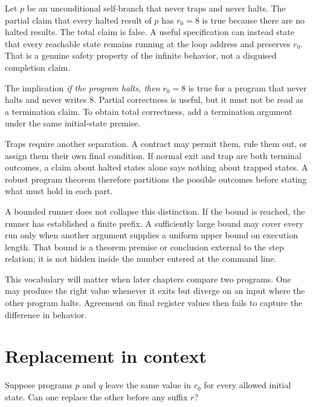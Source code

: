 \begin{example}[title={A vacuous final condition and its repair}]
Let \(p\) be an unconditional self-branch that never traps and never halts.
The partial claim that every halted result of \(p\) has \(r_0=8\) is true
because there are no halted results. The total claim is false. A useful
specification can instead state that every reachable state remains running at
the loop address and preserves \(r_0\). That is a genuine safety property of
the infinite behavior, not a disguised completion claim.
\end{example}

\begin{warning}[title={A true implication may say nothing about arrival}]
The implication \emph{if the program halts, then \(r_0=8\)} is true for a
program that never halts and never writes 8. Partial correctness is useful,
but it must not be read as a termination claim. To obtain total correctness,
add a termination argument under the same initial-state premise.
\end{warning}

Traps require another separation. A contract may permit them, rule them out,
or assign them their own final condition. If normal exit and trap are both
terminal outcomes, a claim about halted states alone says nothing about
trapped states. A robust program theorem therefore partitions the possible
outcomes before stating what must hold in each part.

A bounded runner does not collapse this distinction. If the bound is reached,
the runner has established a finite prefix. A sufficiently large bound may
cover every run only when another argument supplies a uniform upper bound on
execution length. That bound is a theorem premise or conclusion external to
the step relation; it is not hidden inside the number entered at the command
line.

This vocabulary will matter when later chapters compare two programs. One may
produce the right value whenever it exits but diverge on an input where the
other program halts. Agreement on final register values then fails to capture
the difference in behavior.

\section{Replacement in context}

Suppose programs \(p\) and \(q\) leave the same value in \(r_0\) for every
allowed initial state. Can one replace the other before any suffix \(r\)?


